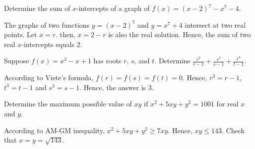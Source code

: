\begin{problem}
Determine the sum of $x$-intercepts of a graph of $f(x)=(x-2)^7-x^7-4$.
\end{problem}

\begin{solution}
The graphs of two functions $y=(x-2)^7$ and $y=x^7+4$ intersect at two real points. Let $x=r$. then, $x=2-r$ is also the real solution. Hence, the sum of two real $x$-intercepts equals $2$. 
\end{solution}

\begin{problem}
Suppose $f(x)=x^3-x+1$ has roots $r$, $s$, and $t$. Determine $\frac{r^3}{r-1}+\frac{s^3}{s-1}+\frac{t^3}{t-1}$.
\end{problem}

\begin{solution}
According to Viete's formula, $f(r)=f(s)=f(t)=0$. Hence, $r^3=r-1$, $t^3=t-1$ and $s^3=s-1$. Hence, the answer is $3$.
\end{solution}

\begin{problem}
Determine the maximum possible value of $xy$ if $x^2+5xy+y^2=1001$ for real $x$ and $y$.
\end{problem}

\begin{solution}
According to AM-GM inequality, $x^2+5xy+y^2\geq 7xy$. Hence, $xy\leq 143$. Check that $x=y=\sqrt{143}$.
\end{solution}